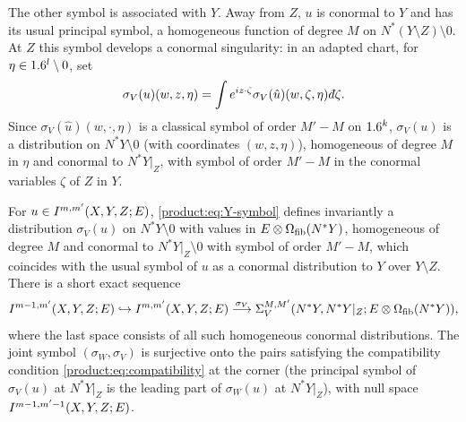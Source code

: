 The other symbol is associated with $Y$. Away from $Z$, $u$ is conormal to $Y$ and
has its usual principal symbol, a homogeneous function of degree $M$ on
$N^*(Y\setminus Z)\setminus0$. At $Z$ this symbol develops a conormal singularity:
in an adapted chart, for $\eta\in1.6^l\setminus0$, set
\begin{equation}\label{product:eq:Y-symbol}
\sigma_V(u)(w,z,\eta)=\int e^{iz\cdot\zeta}\sigma_V(\hat u)(w,\zeta,\eta)\,\dbar\zeta.
\end{equation}
Since $\sigma_V(\hat u)(w,\cdot,\eta)$ is a classical symbol of order $M'-M$ on
$1.6^k$, $\sigma_V(u)$ is a distribution on $N^*Y\setminus0$ (with coordinates
$(w,z,\eta)$), homogeneous of degree $M$ in $\eta$ and conormal to $N^*Y|_Z$,
with symbol of order $M'-M$ in the conormal variables $\zeta$ of $Z$ in $Y$.

\begin{proposition}[Symbol at $Y$]\label{product:prop:Y-symbol}
For $u\in I^{m,m'}(X,Y,Z;E)$, \eqref{product:eq:Y-symbol} defines invariantly a
distribution $\sigma_V(u)$ on $N^*Y\setminus0$ with values in
$E\otimes\Omega_{\mathrm{fib}}(N^*Y)$, homogeneous of degree $M$ and conormal to
$N^*Y|_Z\setminus0$ with symbol of order $M'-M$, which coincides with the usual
symbol of $u$ as a conormal distribution to $Y$ over $Y\setminus Z$. There is a
short exact sequence
\begin{equation*}
I^{m-1,m'}(X,Y,Z;E)\hookrightarrow I^{m,m'}(X,Y,Z;E)\overset{\sigma_V}
\longrightarrow\Sigma_V^{M,M'}(N^*Y,N^*Y|_Z;E\otimes\Omega_{\mathrm{fib}}(N^*Y)),
\end{equation*}
where the last space consists of all such homogeneous conormal distributions.
The joint symbol $(\sigma_W,\sigma_V)$ is surjective onto the pairs satisfying
the compatibility condition \eqref{product:eq:compatibility} at the corner (the
principal symbol of $\sigma_V(u)$ at $N^*Y|_Z$ is the leading part of
$\sigma_W(u)$ at $N^*Y|_Z$), with null space $I^{m-1,m'-1}(X,Y,Z;E)$.
\end{proposition}

